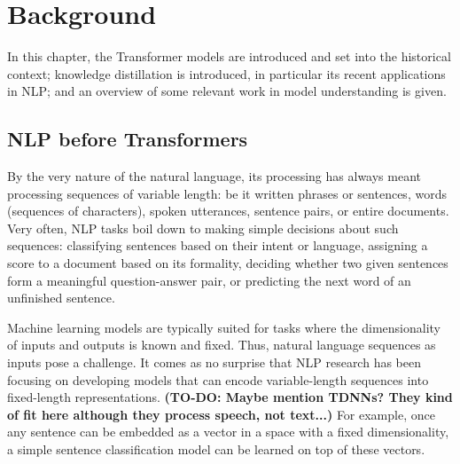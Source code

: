 \documentclass[bsc,frontabs,twoside,singlespacing,parskip,deptreport]{infthesis}
\begin{document}
\chapter{Background}{
  \label{ch:background}

  In this chapter, the Transformer models are introduced and set into the historical context; knowledge distillation is introduced, in particular its recent applications in NLP; and an overview of some relevant work in model understanding is given.

  \section{NLP before Transformers}{
    \label{sec:pre-transformer-nlp}
    By the very nature of the natural language, its processing has always meant processing sequences of variable length: be it written phrases or sentences, words (sequences of characters), spoken utterances, sentence pairs, or entire documents.
    Very often, NLP tasks boil down to making simple decisions about such sequences: classifying sentences based on their intent or language, assigning a score to a document based on its formality, deciding whether two given sentences form a meaningful question-answer pair, or predicting the next word of an unfinished sentence.

    Machine learning models are typically suited for tasks where the dimensionality of inputs and outputs is known and fixed. Thus, natural language sequences as inputs pose a challenge. It comes as no surprise that NLP research has been focusing on developing models that can encode variable-length sequences into fixed-length representations. 
    \textbf{(TO-DO: Maybe mention TDNNs? They kind of fit here although they process speech, not text...)}
    For example, once any sentence can be embedded as a vector in a space with a fixed dimensionality, a simple sentence classification model can be learned on top of these vectors.

}}
\end{document}
